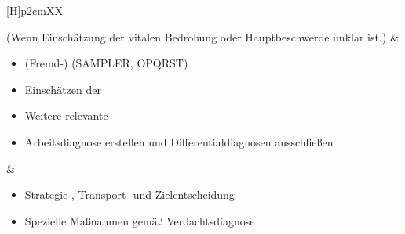 \begin{tcolorbox}
\begin{minipage}[t]{\linewidth -
{2\fboxrule} - {2\fboxsep}}
\begin{minipage}[t]{\linewidth}
{\begin{tabularx}{\linewidth}[H]{p{2cm}XX}

{\tiny (Wenn Einschätzung der vitalen
Bedrohung oder Hauptbeschwerde unklar ist.)}
&
\begin{minipage}[t]{\linewidth}
\begin{itemize}
  \item (Fremd-)  (SAMPLER, OPQRST)
  \item Einschätzen der 
  \item Weitere relevante 
  \item Arbeitsdiagnose erstellen und Differentialdiagnosen
  ausschließen
\end{itemize}
\end{minipage}
&
\noindent\color{DefaultA}\begin{minipage}[t]{\linewidth}
\begin{itemize}
  \item Strategie-, Transport- und Zielentscheidung 
  \item Spezielle Maßnahmen gemäß Verdachtsdiagnose
\end{itemize}
\end{minipage}
\\\addlinespace\bottomrule
\end{tabularx}

\begin{center}
   \tiny


\end{center}}
\end{minipage}
\end{minipage}
\end{tcolorbox}
